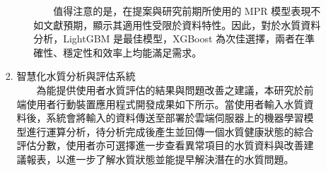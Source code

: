 \documentclass[12pt,a4paper]{article}
\begin{document}
\begin{enumerate}
\begin{enumerate}[label=\arabic*.]
\begin{enumerate}[label=3-2-\arabic*.]
\begin{enumerate}[label=\Alph*.]
                        　　值得注意的是，在提案與研究前期所使用的 MPR 模型表現不如文獻預期，顯示其適用性受限於資料特性。因此，對於水質資料分析，LightGBM 是最佳模型，XGBoost 為次佳選擇，兩者在準確性、穩定性和效率上均能滿足需求。
            \end{enumerate}
        \item 智慧化水質分析與評估系統\\
        　　為能提供使用者水質評估的結果與問題改善之建議，本研究於前端使用者行動裝置應用程式開發成果如下所示。當使用者輸入水質資料後，系統會將輸入的資料傳送至部署於雲端伺服器上的機器學習模型進行運算分析，待分析完成後產生並回傳一個水質健康狀態的綜合評估分數，使用者亦可選擇進一步查看異常項目的水質資料與改善建議報表，以進一步了解水質狀態並能提早解決潛在的水質問題。
            \begin{figure}[H]
                \centering
                \begin{minipage}{0.35\textwidth}
                    \centering

\end{minipage}
\end{figure}
\end{enumerate}
\end{enumerate}
\end{enumerate}
\end{document}
